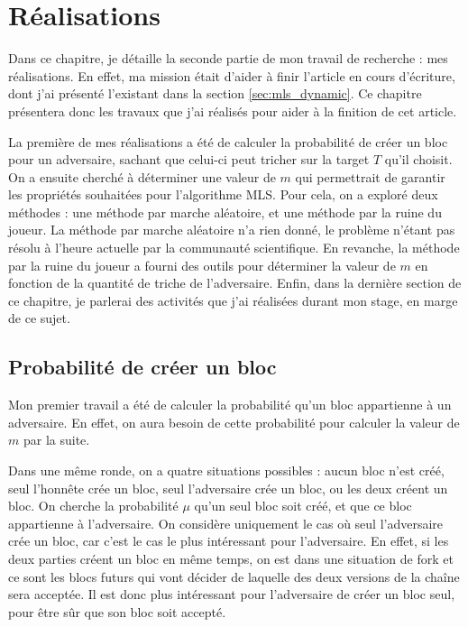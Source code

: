 \chapter{Réalisations}\label{chap:realisations}

	Dans ce chapitre, je détaille la seconde partie de mon travail de recherche :
	mes réalisations. En effet, ma mission était d'aider à finir l'article en
	cours d'écriture, dont j'ai présenté l'existant dans la section
	\ref{sec:mls_dynamic}. Ce chapitre présentera donc les travaux que j'ai
	réalisés pour aider à la finition de cet article.

	La première de mes réalisations a été de calculer la probabilité de créer un
	bloc pour un adversaire, sachant que celui-ci peut tricher sur la target $T$
	qu'il choisit. On a ensuite cherché à déterminer une valeur de $m$ qui
	permettrait de garantir les propriétés souhaitées pour l'algorithme MLS. Pour
	cela, on a exploré deux méthodes : une méthode par marche aléatoire, et une
	méthode par la ruine du joueur. La méthode par marche aléatoire n'a rien
	donné, le problème n'étant pas résolu à l'heure actuelle par la communauté
	scientifique. En revanche, la méthode par la ruine du joueur a fourni des
	outils pour déterminer la valeur de $m$ en fonction de la quantité de triche
	de l'adversaire. Enfin, dans la dernière section de ce chapitre, je parlerai
	des activités que j'ai réalisées durant mon stage, en marge de ce sujet.


\section{Probabilité de créer un bloc}\label{sec:probabilite-bloc}

	Mon premier travail a été de calculer la probabilité qu'un bloc appartienne à
	un adversaire. En effet, on aura besoin de cette probabilité pour calculer la
	valeur de $m$ par la suite.

	Dans une même ronde, on a quatre situations possibles : aucun bloc n'est créé,
	seul l'honnête crée un bloc, seul l'adversaire crée un bloc, ou les deux
	créent un bloc. On cherche la probabilité $\mu$ qu'un seul bloc soit créé, et
	que ce bloc appartienne à l'adversaire. On considère uniquement le cas où seul
	l'adversaire crée un bloc, car c'est le cas le plus intéressant pour
	l'adversaire. En effet, si les deux parties créent un bloc en même temps, on
	est dans une situation de fork et ce sont les blocs futurs qui vont décider de
	laquelle des deux versions de la chaîne sera acceptée. Il est donc plus
	intéressant pour l'adversaire de créer un bloc seul, pour être sûr que son
	bloc soit accepté.

